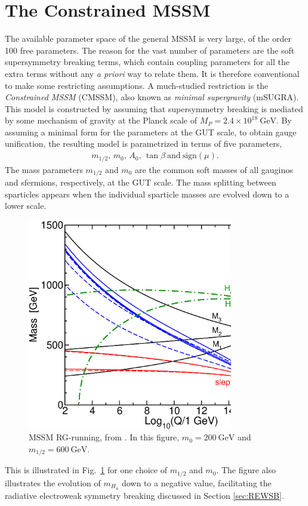 \documentclass[twoside,english]{uiofysmaster}
\begin{document}
\section{The Constrained MSSM}
\label{sec:cmssm}
The available parameter space of the general MSSM is very large, of the order 100 free parameters. The reason for the vast number of parameters are the soft supersymmetry breaking terms, which contain coupling parameters for all the extra terms without any {\it a priori} way to relate them. It is therefore conventional to make some restricting assumptions. A much-studied restriction is the {\it Constrained MSSM} (CMSSM), also known as {\it minimal supergravity} (mSUGRA). This model is constructed by assuming that supersymmetry breaking is mediated by some mechanism of gravity at the Planck scale of $M_P = 2.4\times 10^{18} ~\mathrm{GeV}$. By assuming a minimal form for the parameters at the GUT scale, to obtain gauge unification, the resulting model is parametrized in terms of five parameters,
\begin{align}
	m_{1/2}, \, m_{0}, \, A_0, \, \tan\beta ~\mathrm{and} ~\mathrm{sign}(\mu).
\end{align}
The mass parameters $m_{1/2}$ and $m_0$ are the common soft masses of all gauginos and sfermions, respectively, at the GUT scale. The mass splitting between sparticles appears when the individual sparticle masses are evolved down to a lower scale.
\begin{figure}[hbt]
	\centering
	\includegraphics[width=0.8\textwidth]{figures/susyintro/MSSMrun.eps}
	\caption{MSSM RG-running, from \cite{Martin:1997ns}. In this figure, $m_0 = 200 ~\mathrm{GeV}$ and $m_{1/2}= 600 ~\mathrm{GeV}$.}
	\label{fig:mssm_rgerun}
\end{figure}
This is illustrated in Fig.\ \ref{fig:mssm_rgerun} for one choice of $m_{1/2}$ and $m_0$. The figure also illustrates the evolution of $m_{H_u}$ down to a negative value, facilitating the radiative electroweak symmetry breaking discussed in Section \ref{sec:REWSB}.
\end{document}
